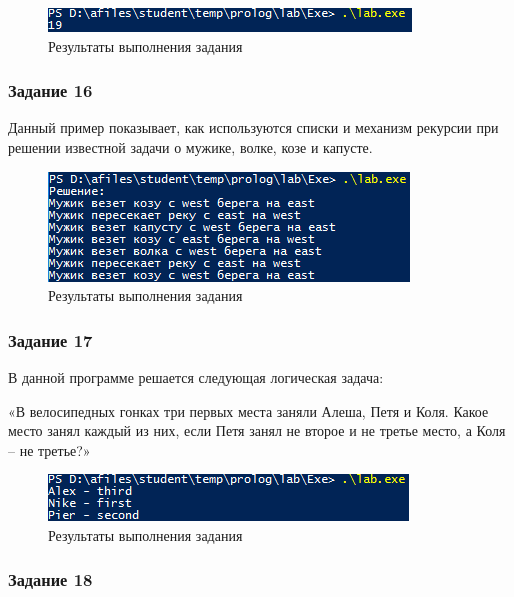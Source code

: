 \documentclass[14pt,a4paper,report]{report}
\begin{document}


\begin{figure}[h!]
	\centering
	\includegraphics[scale = 1.0]{images/d15.png}
	\caption{Результаты выполнения задания}
\end{figure}

\subsubsection{Задание 16}

Данный пример показывает, как используются списки и механизм рекурсии при решении известной задачи о мужике, волке, козе и капусте.



\begin{figure}[h!]
	\centering
	\includegraphics[scale = 1.0]{images/d16.png}
	\caption{Результаты выполнения задания}
\end{figure}

\subsubsection{Задание 17}

В данной программе решается следующая логическая задача:

«В велосипедных гонках три первых места заняли Алеша, Петя и Коля. Какое место занял каждый из них, если Петя занял не второе и не третье место, а Коля – не третье?»



\begin{figure}[h!]
	\centering
	\includegraphics[scale = 1.0]{images/d17.png}
	\caption{Результаты выполнения задания}
\end{figure}

\subsubsection{Задание 18}
\end{document}

